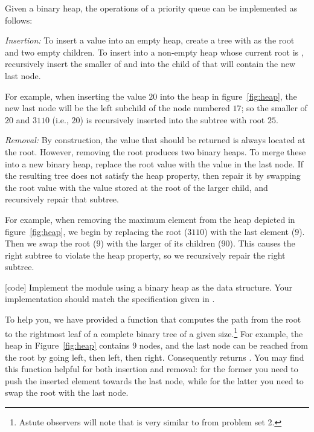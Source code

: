 \documentclass{pset}
\begin{document}
Given a binary heap, the operations of a priority queue can be
implemented as follows:
\begin{description}
\item{\textit{Insertion:}} To insert a value  into an empty
  heap, create a tree with  as the root and two empty
  children. To insert  into a non-empty heap  whose
  current root is , recursively insert the smaller of 
  and  into the child of  that will contain the new
  last node.

  For example, when inserting the value $20$ into the heap in
  figure~\ref{fig:heap}, the new last node will be the left subchild
  of the node numbered $17$; so the smaller of $20$ and $3110$ (i.e.,
  $20$) is recursively inserted into the subtree with root $25$.

\item{\textit{Removal:}} By construction, the value that should be
  returned is always located at the root. However, removing the root
  produces two binary heaps. To merge these into a new binary heap,
  replace the root value with the value in the last node. If the
  resulting tree does not satisfy the heap property, then repair it by
  swapping the root value with the value stored at the root of the
  larger child, and recursively repair that subtree.

  For example, when removing the maximum element from the heap
  depicted in figure~\ref{fig:heap}, we begin by replacing the root
  ($3110$) with the last element ($9$). Then we swap the root ($9$)
  with the larger of its children ($90$). This causes the right
  subtree to violate the heap property, so we recursively repair the
  right subtree.
\end{description}

\newpage{}

\exercise{}
\label{ex:heappq}
[code] Implement the  module using a binary heap
as the data structure. Your implementation should match the
specification given in .

To help you, we have provided a function  that
computes the path from the root to the rightmost leaf of a complete
binary tree of a given size.\footnote{Astute observers will note that
   is very similar to  from
  problem set 2.} For example, the heap in Figure~\ref{fig:heap}
contains 9 nodes, and the last node can be reached from the root by
going left, then left, then right. Consequently 
returns . You may find this function helpful
for both insertion and removal: for the former you need to push the
inserted element towards the last node, while for the latter you need
to swap the root with the last node.
\end{document}
